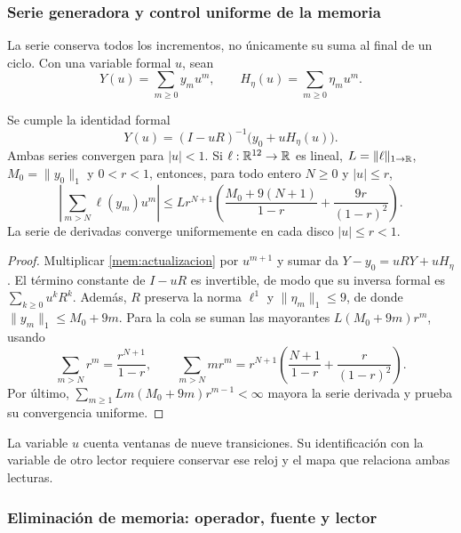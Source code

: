 \subsubsection{Serie generadora y control uniforme de la memoria}

La serie conserva todos los incrementos, no únicamente su suma al final
de un ciclo. Con una variable formal \(u\), sean
\[
 Y(u)=\sum_{m\geq0}y_mu^m,\qquad
 H_\eta(u)=\sum_{m\geq0}\eta_mu^m.
\]

\begin{proposition}
\label{mem:prop-serie}
Se cumple la identidad formal
\begin{equation}
 Y(u)=(I-uR)^{-1}\bigl(y_0+uH_\eta(u)\bigr).
 \label{mem:serie}
\end{equation}
Ambas series convergen para \(|u|<1\). Si \(\ell:\mathbb R^{12}\to\mathbb R\)
es lineal, \(L=\|\ell\|_{1\to\mathbb R}\), \(M_0=\|y_0\|_1\) y
\(0<r<1\), entonces, para todo entero \(N\geq0\) y \(|u|\leq r\),
\begin{equation}
 \left|\sum_{m>N}\ell(y_m)u^m\right|
 \leq Lr^{N+1}\left(
 \frac{M_0+9(N+1)}{1-r}+\frac{9r}{(1-r)^2}\right).
 \label{mem:cota}
\end{equation}
La serie de derivadas converge uniformemente en cada disco
\(|u|\leq r<1\).
\end{proposition}
\begin{proof}
Multiplicar \eqref{mem:actualizacion} por \(u^{m+1}\) y sumar da
\(Y-y_0=uRY+uH_\eta\). El término constante de \(I-uR\) es
invertible, de modo que su inversa formal es \(\sum_{k\geq0}u^kR^k\).
Además, \(R\) preserva la norma \(\ell^1\) y
\(\|\eta_m\|_1\leq9\), de donde
\(\|y_m\|_1\leq M_0+9m\).
Para la cola se suman las mayorantes
\(L(M_0+9m)r^m\), usando
\[
 \sum_{m>N}r^m=\frac{r^{N+1}}{1-r},\qquad
 \sum_{m>N}mr^m=r^{N+1}
 \left(\frac{N+1}{1-r}+\frac r{(1-r)^2}\right).
\]
Por último, \(\sum_{m\geq1}Lm(M_0+9m)r^{m-1}<\infty\)
mayora la serie derivada y prueba su convergencia uniforme.
\end{proof}

La variable \(u\) cuenta ventanas de nueve transiciones. Su identificación
con la variable de otro lector requiere conservar ese reloj y el mapa
que relaciona ambas lecturas.

\subsubsection{Eliminación de memoria: operador, fuente y lector}

